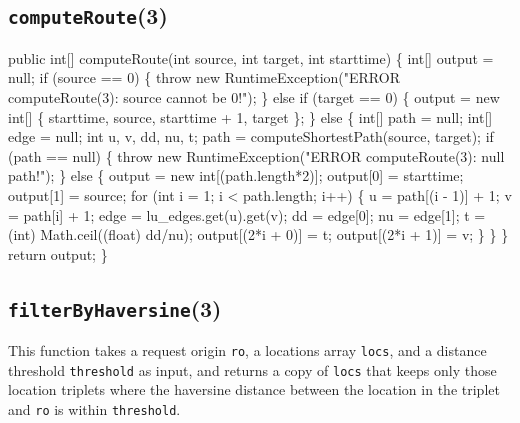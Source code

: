 \documentclass{article}
\def\nwendcode{\endtrivlist \endgroup}      %
\let\nwdocspar=\par
\begin{document}
\subsection{{\tt{}\protect{}computeRoute}(3)}
\nwenddocs{}\endmoddef{}
public int[] computeRoute(int source, int target, int starttime) \{
  int[] output = null;
  if (source == 0) \{
    throw new RuntimeException("ERROR computeRoute(3): source cannot be 0!");
  \} else if (target == 0) \{
    output = new int[] \{ starttime, source, starttime + 1, target \};
  \} else \{
    int[] path = null;
    int[] edge = null;
    int u, v, dd, nu, t;
    path = computeShortestPath(source, target);
    if (path == null) \{
      throw new RuntimeException("ERROR computeRoute(3): null path!");
    \} else \{
      output = new int[(path.length*2)];
      output[0] = starttime;
      output[1] = source;
      for (int i = 1; i < path.length; i++) \{
        u = path[(i - 1)] + 1;
        v = path[i] + 1;
        edge = lu_edges.get(u).get(v);
        dd = edge[0];
        nu = edge[1];
        t = (int) Math.ceil((float) dd/nu);
        output[(2*i + 0)] = t;
        output[(2*i + 1)] = v;
      \}
    \}
  \}
  return output;
\}
\eatline
{}\nwendcode{}\nwdocspar
\subsection{{\tt{}\protect{}filterByHaversine}(3)}
This function takes a request origin {\tt{}ro}, a locations array {\tt{}locs}, and
a distance threshold {\tt{}threshold} as input, and returns a copy of {\tt{}locs}
that keeps only those location triplets where the haversine distance between
the location in the triplet and {\tt{}ro} is within {\tt{}threshold}.
\end{document}
